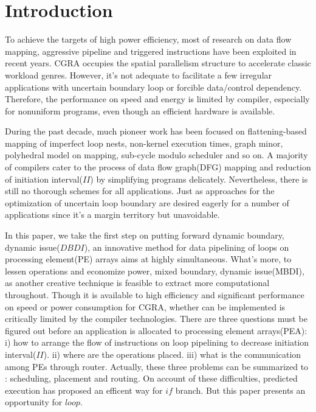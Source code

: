 \documentclass[10pt, conference, compsocconf]{IEEEtran}
\begin{document}
\section{Introduction}
To achieve the targets of high power efficiency, most of research on data flow mapping\cite{bg-epimap}, aggressive pipeline\cite{bg-aggressive} and triggered instructions\cite{bg-triggered} have been exploited in recent years. CGRA occupies the spatial parallelism structure to accelerate classic workload genres. However, it's not adequate to facilitate a few irregular applications with uncertain boundary loop or forcible data/control dependency. Therefore, the performance on speed and energy is limited by compiler, especially for nonuniform programs, even though an efficient hardware is available\cite{bg-operation}.

During the past decade, much pioneer work has been focused on flattening-based mapping of imperfect loop nests\cite{in-flattening}, non-kernel execution times\cite{in-kim2012improving}, graph minor\cite{in-chen2014graph}, polyhedral model on mapping\cite{in-liu2013polyhedral}, sub-cycle modulo scheduler\cite{in-park2009cgra} and so on. A majority of compilers cater to the process of data flow graph(DFG) mapping and reduction of initiation interval($II$) by simplifying programs delicately. Nevertheless, there is still no thorough schemes for all applications. Just as approaches for the optimization of uncertain loop boundary are desired eagerly for a number of applications since it's a margin territory but unavoidable.

In this paper, we take the first step on putting forward dynamic boundary, dynamic issue($DBDI$), an innovative method for data pipelining of loops on processing element(PE) arrays aims at highly simultaneous. What’s more, to lessen operations and economize power, mixed boundary, dynamic issue(MBDI), as another creative technique is feasible to extract more computational throughout. Though it is available to high efficiency and significant performance on speed or power consumption for CGRA, whether can be implemented is critically limited by the compiler technologies.
There are three questions must be figured out before an application is allocated to processing element arrays(PEA): i) how to arrange the flow of instructions on loop pipelining to decrease initiation interval($II$). ii) where are the operations placed. iii) what is the communication among PEs through router.
Actually, these three problems can be summarized to : scheduling, placement and routing.
On account of these difficulties, predicted execution\cite{mo-wang2015acceleration} has proposed an efficent way for $if$ branch. But this paper presents an opportunity for $loop$.
\end{document}
